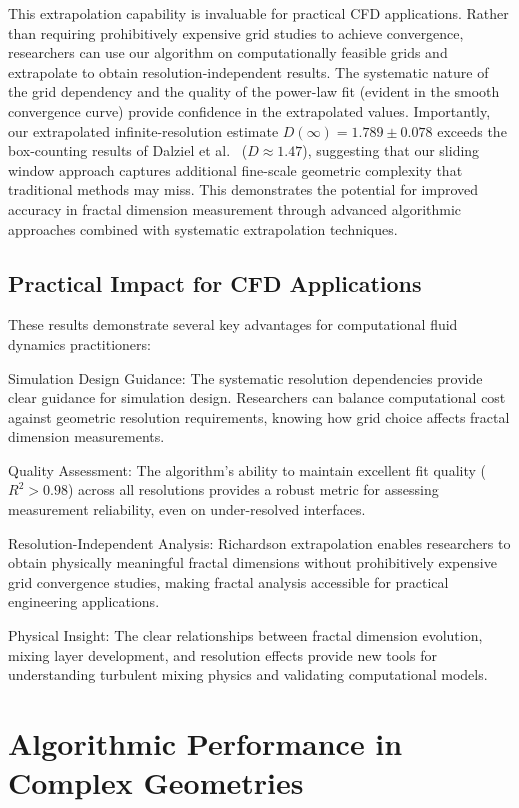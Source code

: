 \documentclass[preprint,12pt]{elsarticle}
\def\textbf#1{#1}%
\begin{document}
This extrapolation capability is invaluable for practical CFD applications. Rather than requiring prohibitively expensive grid studies to achieve convergence, researchers can use our algorithm on computationally feasible grids and extrapolate to obtain resolution-independent results. The systematic nature of the grid dependency and the quality of the power-law fit (evident in the smooth convergence curve) provide confidence in the extrapolated values. Importantly, our extrapolated infinite-resolution estimate $D(\infty) = 1.789 \pm 0.078$ exceeds the box-counting results of Dalziel et al.~\cite{dalziel1999} ($D \approx 1.47$), suggesting that our sliding window approach captures additional fine-scale geometric complexity that traditional methods may miss. This demonstrates the potential for improved accuracy in fractal dimension measurement through advanced algorithmic approaches combined with systematic extrapolation techniques.

\subsection{Practical Impact for CFD Applications}
\label{subsec:practical_impact}

These results demonstrate several key advantages for computational fluid dynamics practitioners:

\textbf{Simulation Design Guidance}: The systematic resolution dependencies provide clear guidance for simulation design. Researchers can balance computational cost against geometric resolution requirements, knowing how grid choice affects fractal dimension measurements.

\textbf{Quality Assessment}: The algorithm's ability to maintain excellent fit quality ($R^2 > 0.98$) across all resolutions provides a robust metric for assessing measurement reliability, even on under-resolved interfaces.

\textbf{Resolution-Independent Analysis}: Richardson extrapolation enables researchers to obtain physically meaningful fractal dimensions without prohibitively expensive grid convergence studies, making fractal analysis accessible for practical engineering applications.

\textbf{Physical Insight}: The clear relationships between fractal dimension evolution, mixing layer development, and resolution effects provide new tools for understanding turbulent mixing physics and validating computational models.

\section{Algorithmic Performance in Complex Geometries}
\label{sec:algorithmic_performance}
\end{document}
